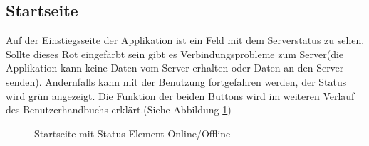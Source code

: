 \subsection{Startseite}
Auf der Einstiegsseite der Applikation ist ein Feld mit dem Serverstatus zu sehen. Sollte dieses Rot eingefärbt sein gibt es Verbindungsprobleme zum Server(die Applikation kann keine Daten vom Server erhalten oder Daten an den Server senden). Andernfalls kann mit der Benutzung fortgefahren werden, der Status wird grün angezeigt. Die Funktion der beiden Buttons wird im weiteren Verlauf des Benutzerhandbuchs erklärt.(Siehe Abbildung \ref{img:onlineOffline})
\\
\begin{figure}[H]
    \centering
    \qquad
    \caption{Startseite mit Status Element Online/Offline}
    \label{img:onlineOffline}
\end{figure}
\\
